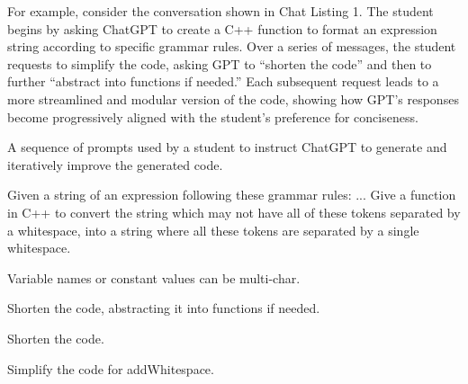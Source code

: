 For example, consider the conversation shown in Chat Listing 1. The student begins by asking ChatGPT to create a C++ function to format an expression string according to specific grammar rules. Over a series of messages, the student requests to simplify the code, asking GPT to “shorten the code” and then to further “abstract into functions if needed.” Each subsequent request leads to a more streamlined and modular version of the code, showing how GPT’s responses become progressively aligned with the student’s preference for conciseness. 

\begin{chatgroup}{A sequence of prompts used by a student to instruct ChatGPT to generate and iteratively improve the generated code.}
    \begin{chatbubble}
     \scriptsize
    Given a string of an expression following these grammar rules: ... Give a function in C++ to convert the string which may not have all of these tokens separated by a whitespace, into a string where all these tokens are separated by a single whitespace.
    \end{chatbubble}
    \begin{chatbubble}
     \scriptsize
    Variable names or constant values can be multi-char.
    \end{chatbubble}
    \begin{chatbubble}
     \scriptsize
    Shorten the code, abstracting it into functions if needed.
    \end{chatbubble}
    \begin{chatbubble}
     \scriptsize
    Shorten the code.
    \end{chatbubble}
    \begin{chatbubble}
     \scriptsize
    Simplify the code for addWhitespace.
    \end{chatbubble}
\end{chatgroup}

